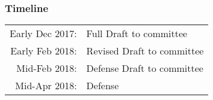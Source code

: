 \documentclass[Proposal]{subfiles}
\begin{document}
%
\begin{frame}
  \frametitle{Timeline}
  \begin{tabular}[t]{rl}
    Early Dec 2017: & Full Draft to committee \\
    Early Feb 2018: & Revised Draft to committee \\
    Mid-Feb 2018: & Defense Draft to committee \\
    Mid-Apr 2018: & Defense \\
  \end{tabular}
\end{frame}
\end{document}
